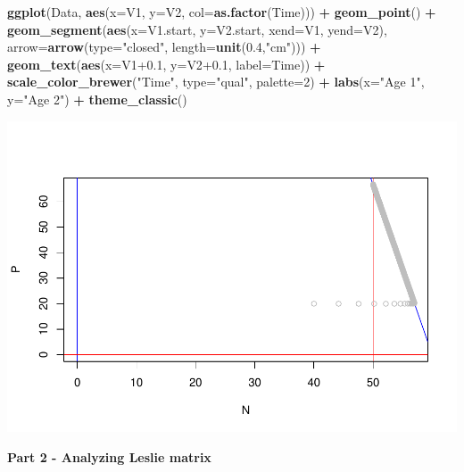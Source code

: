 \documentclass[
]{book}
\newenvironment{Shaded}{\begin{snugshade}}{\end{snugshade}}
\newcommand{\AttributeTok}[1]{\textcolor[rgb]{0.13,0.29,0.53}{#1}}
\newcommand{\DecValTok}[1]{\textcolor[rgb]{0.00,0.00,0.81}{#1}}
\newcommand{\FloatTok}[1]{\textcolor[rgb]{0.00,0.00,0.81}{#1}}
\newcommand{\FunctionTok}[1]{\textcolor[rgb]{0.13,0.29,0.53}{\textbf{#1}}}
\newcommand{\NormalTok}[1]{#1}
\newcommand{\SpecialCharTok}[1]{\textcolor[rgb]{0.81,0.36,0.00}{\textbf{#1}}}
\newcommand{\StringTok}[1]{\textcolor[rgb]{0.31,0.60,0.02}{#1}}
\begin{document}
\begin{Shaded}
\begin{Highlighting}[]
\FunctionTok{ggplot}\NormalTok{(Data, }\FunctionTok{aes}\NormalTok{(}\AttributeTok{x=}\NormalTok{V1, }\AttributeTok{y=}\NormalTok{V2, }\AttributeTok{col=}\FunctionTok{as.factor}\NormalTok{(Time))) }\SpecialCharTok{+} 
  \FunctionTok{geom\_point}\NormalTok{() }\SpecialCharTok{+} 
  \FunctionTok{geom\_segment}\NormalTok{(}\FunctionTok{aes}\NormalTok{(}\AttributeTok{x=}\NormalTok{V1.start, }\AttributeTok{y=}\NormalTok{V2.start, }\AttributeTok{xend=}\NormalTok{V1, }\AttributeTok{yend=}\NormalTok{V2), }
               \AttributeTok{arrow=}\FunctionTok{arrow}\NormalTok{(}\AttributeTok{type=}\StringTok{"closed"}\NormalTok{, }\AttributeTok{length=}\FunctionTok{unit}\NormalTok{(}\FloatTok{0.4}\NormalTok{,}\StringTok{"cm"}\NormalTok{))) }\SpecialCharTok{+} 
  \FunctionTok{geom\_text}\NormalTok{(}\FunctionTok{aes}\NormalTok{(}\AttributeTok{x=}\NormalTok{V1}\FloatTok{+0.1}\NormalTok{, }\AttributeTok{y=}\NormalTok{V2}\FloatTok{+0.1}\NormalTok{, }\AttributeTok{label=}\NormalTok{Time)) }\SpecialCharTok{+} 
  \FunctionTok{scale\_color\_brewer}\NormalTok{(}\StringTok{"Time"}\NormalTok{, }\AttributeTok{type=}\StringTok{"qual"}\NormalTok{, }\AttributeTok{palette=}\DecValTok{2}\NormalTok{) }\SpecialCharTok{+} 
  \FunctionTok{labs}\NormalTok{(}\AttributeTok{x=}\StringTok{"Age 1"}\NormalTok{, }\AttributeTok{y=}\StringTok{"Age 2"}\NormalTok{) }\SpecialCharTok{+}  
  \FunctionTok{theme\_classic}\NormalTok{()}
\end{Highlighting}
\end{Shaded}

\includegraphics{bookdown-demo_files/figure-latex/unnamed-chunk-32-1.pdf}

\textbf{Part 2 - Analyzing Leslie matrix}
\end{document}
